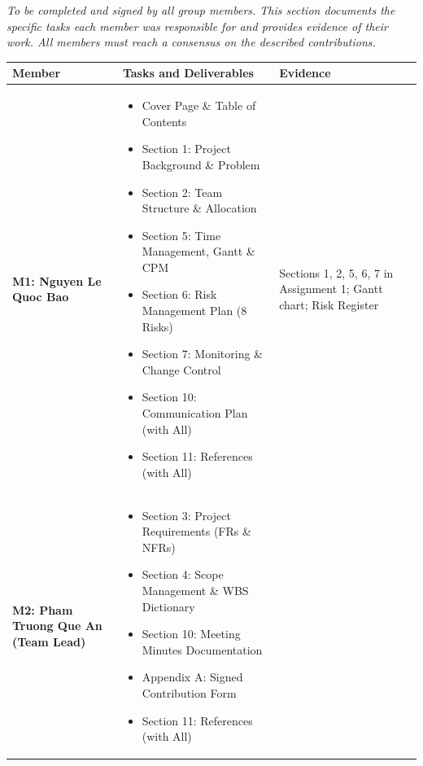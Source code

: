 \documentclass[11pt, a4paper]{article}
\begin{document}
\begin{tcolorbox}[formbox, title=\textbf{2. Team Task \& Contribution Log}]
  \small
  \textit{To be completed and signed by all group members. This section documents the specific tasks each member was responsible for and provides evidence of their work. All members must reach a consensus on the described contributions.}

  \vspace{0.3cm}

  \begin{tabularx}{\linewidth}{@{}L{3cm} L{6.5cm} Y@{}}
    \toprule
    \textbf{Member} & \textbf{Tasks and Deliverables} & \textbf{Evidence} \\
    \midrule
    \textbf{M1: Nguyen Le Quoc Bao} &
    \begin{itemize}[before=\vspace{-1.2em}]
      \item Cover Page \& Table of Contents
      \item Section 1: Project Background \& Problem
      \item Section 2: Team Structure \& Allocation
      \item Section 5: Time Management, Gantt \& CPM
      \item Section 6: Risk Management Plan (8 Risks)
      \item Section 7: Monitoring \& Change Control
      \item Section 10: Communication Plan (with All)
      \item Section 11: References (with All)
    \end{itemize} &
    Sections 1, 2, 5, 6, 7 in Assignment 1; Gantt chart; Risk Register \\
    \textbf{M2: Pham Truong Que An (Team Lead)} &
    \begin{itemize}[before=\vspace{-1.2em}]
      \item Section 3: Project Requirements (FRs \& NFRs)
      \item Section 4: Scope Management \& WBS Dictionary
      \item Section 10: Meeting Minutes Documentation
      \item Appendix A: Signed Contribution Form
      \item Section 11: References (with All)

\end{itemize}
\end{tabularx}
\end{tcolorbox}
\end{document}
